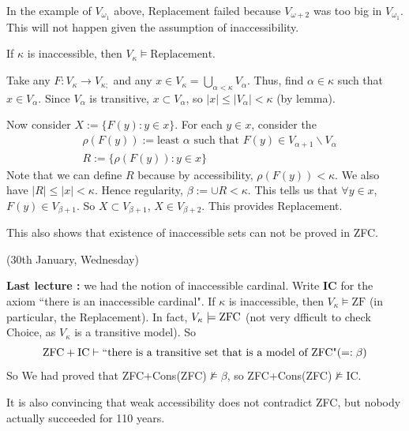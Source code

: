 \documentclass[12pt,a4paper]{article}
\newenvironment{proof}
{\begin{changemargin}{0.5cm}{0.5cm} 
	}%
	{\end{changemargin}
}
\newenvironment{p}
{\begin{proof} 
	}%
	{\end{proof}
}
\begin{document}
In the example of $V_{\omega_1}$ above, Replacement failed because $V_{\omega + 2}$ was too big in $V_{\omega_1}$. This will not happen given the assumption of inaccessibility.
\s

\thm If $\kappa$ is inaccessible, then $V_{\kappa} \models \text{Replacement}$.
\begin{p}
\pf

\quad Take any $F:V_{\kappa} \rightarrow V_{\kappa;}$ and any $x\in V_{\kappa} =\bigcup_{\alpha < \kappa}V_{\alpha}$. Thus, find $\alpha \in \kappa$ such that $x\in V_{\alpha}$. Since $V_{\alpha}$ is transitive, $x\subset V_{\alpha}$, so $|x| \leq |V_{\alpha}| < \kappa$ (by lemma).

\quad Now consider $X:=\{F(y) : y\in x\}$. For each $y\in x$, consider the 
\begin{align*}
&\rho(F(y)) :=\text{least } \alpha \text{ such that }F(y) \in V_{\alpha +1}\backslash V_{\alpha}\\
& R:= \{ \rho(F(y)) : y\in x\}
\end{align*}
Note that we can define $R$ because by accessibility, $\rho(F(y))< \kappa$. We also have $|R| \leq |x|< \kappa$. Hence regularity, $\beta := \cup R < \kappa$. This tells us that $\forall y\in x$, $F(y)\in V_{\beta +1}$. So $X\subset V_{\beta+1}$, $X\in V_{\beta+2}$. This provides Replacement.

\eop 
\end{p}
\s

This also shows that existence of inaccessible sets can not be proved in ZFC.
\s

\newday

(30th January, Wednesday)
\s

\textbf{Last lecture :} we had the notion of inaccessible cardinal. Write \textbf{IC} for the axiom ``there is an inaccessible cardinal". If $\kappa$ is inaccessible, then $V_{\kappa} \models \text{ZF}$ (in particular, the Replacement). In fact, $V_{\kappa} \models \text{ZFC}$ (not very dfficult to check Choice, as $V_{\kappa}$ is a transitive model). So
\begin{align*}
\text{ZFC} + \text{IC} \vdash \text{``there is a transitive set that is a model of ZFC"} (=: \beta)
\end{align*}
So We had proved that ZFC+Cons(ZFC)$\not\models \beta$, so ZFC+Cons(ZFC)$\not\models$IC.
\s

It is also convincing that weak accessibility does not contradict ZFC, but nobody actually succeeded for 110 years.
\s
\end{document}
